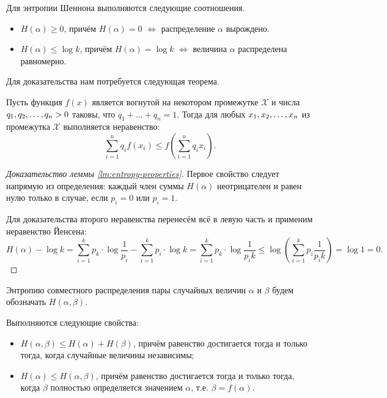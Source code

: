 \documentclass[12pt]{article}
\begin{document}
\begin{lemma}\label{lm:entropy-properties}
Для энтропии Шеннона выполняются следующие соотношения.
\begin{itemize}
\item \(H(\alpha) \ge 0\), причём \(H(\alpha) = 0\) \(\iff\) распределение \(\alpha\) вырождено.

\item \(H(\alpha) \le \log k\), причём \(H(\alpha) = \log k\) \(\iff\) величина \(\alpha\) распределена равномерно.

\end{itemize}
\end{lemma}

Для доказательства нам потребуется следующая теорема.

\begin{theorem}
Пусть функция \(f ( x ) \) является вогнутой на некотором промежутке \(\mathcal {X}\)
и числа \({q}_1,{q}_2,\dotsc,{q}_{n}>0\) таковы, что \(q_1+\ldots +q_{n}=1\). 
Тогда для любых \({x}_1,{x}_2,\dotsc,{x}_{n}\) из промежутка \(\mathcal X\) выполняется неравенство:
\[
\sum _{{i=1}}^{{n}}q_{i}f(x_{i})\leq f\left(\sum _{{i=1}}^{{n}}q_{i}x_{i}\right). 
\]
\end{theorem}
\begin{proof}[Доказательство леммы \ref{lm:entropy-properties}]
Первое свойство следует напрямую из определения: каждый член суммы \(H(\alpha)\) неотрицателен и равен нулю только в случае, если \(p_i = 0\) или \(p_i = 1\).

Для доказательства второго неравенства перенесём всё в левую часть и применим неравенство Йенсена:
\[
H(\alpha) - \log k 
= \sum_{i=1}^k p_k\cdot\log\frac{1}{p_i} - \sum_{i=1}^k p_i\cdot\log k 
= \sum_{i=1}^k p_k\cdot\log\frac{1}{p_ik} 
\le \log\left(\sum_{i=1}^k p_i\frac{1}{p_i k}\right) = \log 1 = 0.
\]
\end{proof}
Энтропию совместного распределения пары случайных величин \(\alpha\) и \(\beta\) будем обозначать \(H(\alpha,\beta)\).
\begin{lemma}
Выполняются следующие свойства:
\begin{itemize}
    \item \(H(\alpha, \beta) \le H(\alpha) + H(\beta)\), причём равенство достигается тогда и только тогда, когда случайные величины независимы;
    \item \(H(\alpha) \le H(\alpha, \beta)\), причём равенство достигается тогда и только тогда, когда \(\beta\) полностью определяется значением \(\alpha\), 
    т.е. \(\beta = f(\alpha)\).
\end{itemize}
\end{lemma}
\end{document}
